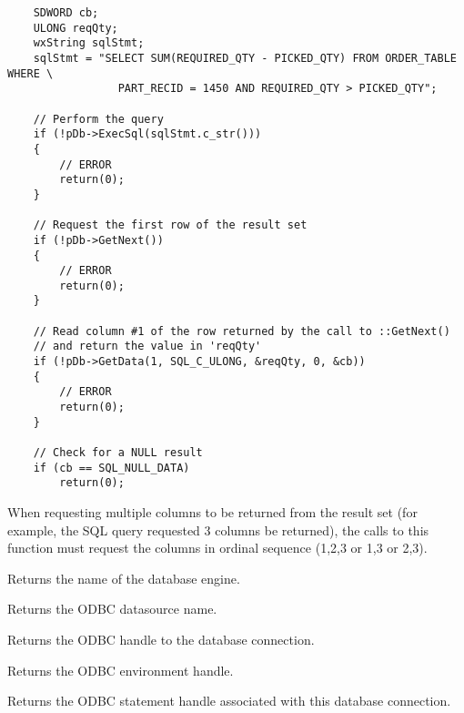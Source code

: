 \begin{verbatim}
    SDWORD cb;
    ULONG reqQty;
    wxString sqlStmt;
    sqlStmt = "SELECT SUM(REQUIRED_QTY - PICKED_QTY) FROM ORDER_TABLE WHERE \
                 PART_RECID = 1450 AND REQUIRED_QTY > PICKED_QTY";

    // Perform the query
    if (!pDb->ExecSql(sqlStmt.c_str()))
    {
        // ERROR
        return(0);
    }

    // Request the first row of the result set
    if (!pDb->GetNext())
    {
        // ERROR
        return(0);
    }

    // Read column #1 of the row returned by the call to ::GetNext() 
    // and return the value in 'reqQty'
    if (!pDb->GetData(1, SQL_C_ULONG, &reqQty, 0, &cb))
    {
        // ERROR
        return(0);
    }

    // Check for a NULL result
    if (cb == SQL_NULL_DATA)
        return(0);
\end{verbatim}


When requesting multiple columns to be returned from the result set (for example, the SQL query
requested 3 columns be returned), the calls to this function must request the columns in ordinal
sequence (1,2,3 or 1,3 or 2,3).  

\label{wxdbgetdatabasename}


Returns the name of the database engine.

\label{wxdbgetdatasourcename}


Returns the ODBC datasource name.

\label{wxdbgethdbc}


Returns the ODBC handle to the database connection.

\label{wxdbgethenv}


Returns the ODBC environment handle.

\label{wxdbgethstmt}


Returns the ODBC statement handle associated with this database connection.

